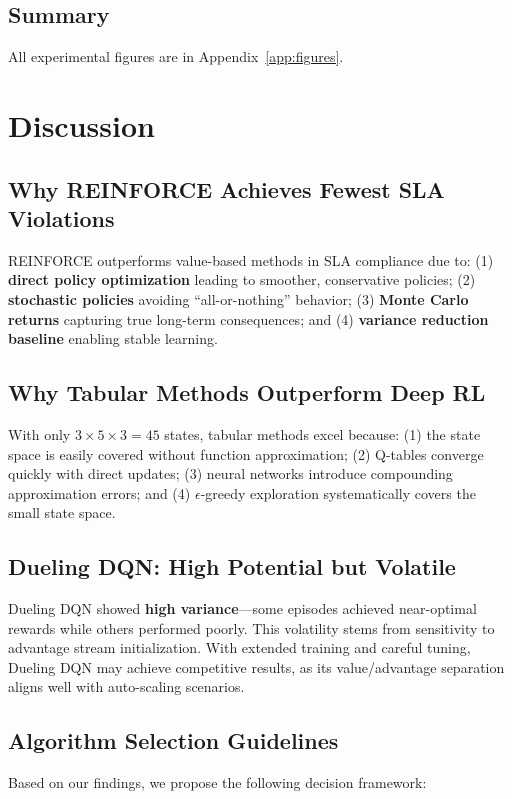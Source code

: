 \documentclass[conference]{IEEEtran}
\begin{document}
\subsection{Summary}
All experimental figures are in Appendix~\ref{app:figures}.

\section{Discussion}

\subsection{Why REINFORCE Achieves Fewest SLA Violations}
REINFORCE outperforms value-based methods in SLA compliance due to: (1) \textbf{direct policy optimization} leading to smoother, conservative policies; (2) \textbf{stochastic policies} avoiding ``all-or-nothing'' behavior; (3) \textbf{Monte Carlo returns} capturing true long-term consequences; and (4) \textbf{variance reduction baseline} enabling stable learning.

\subsection{Why Tabular Methods Outperform Deep RL}
With only $3 \times 5 \times 3 = 45$ states, tabular methods excel because: (1) the state space is easily covered without function approximation; (2) Q-tables converge quickly with direct updates; (3) neural networks introduce compounding approximation errors; and (4) $\epsilon$-greedy exploration systematically covers the small state space.

\subsection{Dueling DQN: High Potential but Volatile}
Dueling DQN showed \textbf{high variance}---some episodes achieved near-optimal rewards while others performed poorly. This volatility stems from sensitivity to advantage stream initialization. With extended training and careful tuning, Dueling DQN may achieve competitive results, as its value/advantage separation aligns well with auto-scaling scenarios.

\subsection{Algorithm Selection Guidelines}
Based on our findings, we propose the following decision framework:
\end{document}
